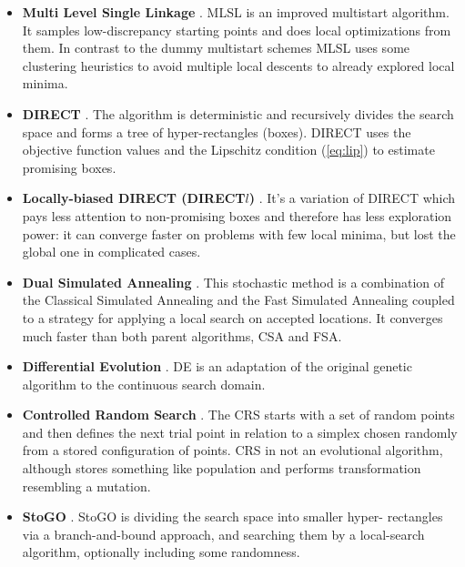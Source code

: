 \documentclass[runningheads]{llncs}
\begin{document}
\begin{itemize}
  \item \textbf{Multi Level Single Linkage} \cite{Kan1987StochasticGO}. MLSL is an improved
multistart algorithm.
  It samples low-discrepancy starting points and does local optimizations from them. In contrast to
the dummy multistart schemes
  MLSL uses some clustering heuristics to avoid multiple local descents to already explored local
minima.

  \item \textbf{DIRECT} \cite{Jones2009}. The algorithm is deterministic and recursively divides
the search space and forms a tree of hyper-rectangles (boxes). DIRECT uses the objective function
values and the Lipschitz condition (\ref{eq:lip}) to estimate promising boxes.

  \item \textbf{Locally-biased DIRECT (DIRECT$l$)} \cite{Gablonsky2001}. It's a variation of
DIRECT which pays less attention to non-promising boxes and therefore
  has less exploration power: it can converge faster on problems with few local minima, but lost the
global one in complicated cases.

  \item \textbf{Dual Simulated Annealing} \cite{XIANG1997216}. This stochastic method is a
combination of the Classical Simulated Annealing and the Fast Simulated Annealing coupled to a
strategy for applying a local search on accepted locations. It converges much faster than both parent
algorithms, CSA and FSA.

  \item \textbf{Differential Evolution} \cite{Storn1997}. DE is an adaptation of the original genetic
algorithm to
  the continuous search domain.

  \item \textbf{Controlled Random Search} \cite{Price1983}. The CRS starts with a set of random
points and then defines
  the next trial point in relation to a simplex chosen randomly from a stored configuration of points.
CRS in not an
  evolutional algorithm, although stores something like population and performs transformation
resembling a mutation.

  \item \textbf{StoGO} \cite{Madsen1998}. StoGO is dividing the search space into smaller hyper-
rectangles via a branch-and-bound approach,
  and searching them by a local-search algorithm, optionally including some randomness.

\end{itemize}
\end{document}
